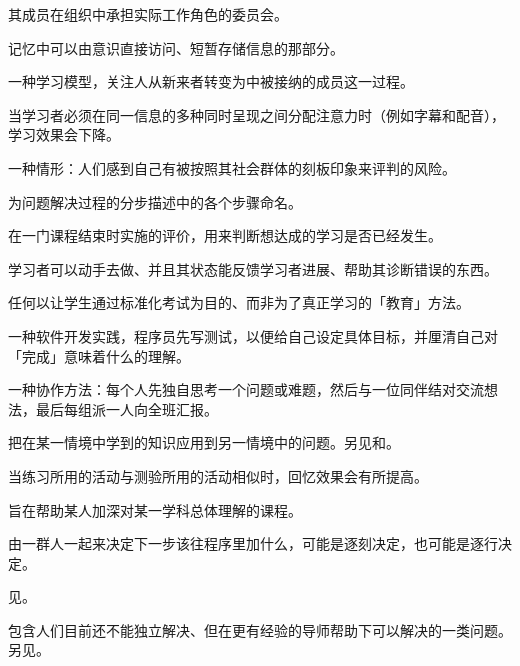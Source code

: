 \begin{description}
 其成员在组织中承担实际工作角色的委员会。

 记忆中可以由意识直接访问、短暂存储信息的那部分。

 一种学习模型，关注人从新来者转变为中被接纳的成员这一过程。

 当学习者必须在同一信息的多种同时呈现之间分配注意力时（例如字幕和配音），学习效果会下降。

 一种情形：人们感到自己有被按照其社会群体的刻板印象来评判的风险。

 为问题解决过程的分步描述中的各个步骤命名。

 在一门课程结束时实施的评价，用来判断想达成的学习是否已经发生。

 学习者可以动手去做、并且其状态能反馈学习者进展、帮助其诊断错误的东西。

 任何以让学生通过标准化考试为目的、而非为了真正学习的「教育」方法。

 一种软件开发实践，程序员先写测试，以便给自己设定具体目标，并厘清自己对「完成」意味着什么的理解。

 一种协作方法：每个人先独自思考一个问题或难题，然后与一位同伴结对交流想法，最后每组派一人向全班汇报。

 把在某一情境中学到的知识应用到另一情境中的问题。另见和。

 当练习所用的活动与测验所用的活动相似时，回忆效果会有所提高。

 旨在帮助某人加深对某一学科总体理解的课程。

 由一群人一起来决定下一步该往程序里加什么，可能是逐刻决定，也可能是逐行决定。

 见。

 包含人们目前还不能独立解决、但在更有经验的导师帮助下可以解决的一类问题。另见。

\end{description}
